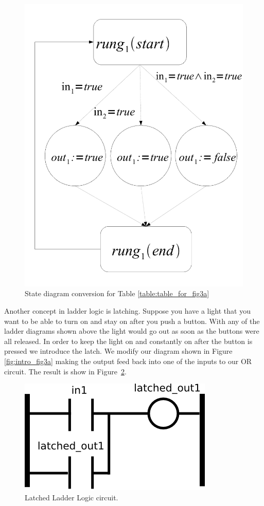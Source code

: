 \begin{figure}[h]
    \centering
    \includegraphics[width=\imgmedsmall]{./images/intro_or_graph_3a.pdf} %
    \caption{State diagram conversion for Table \ref{table:table_for_fig3a}}
    \label{fig:intro_or_graph_3a}
\end{figure}

Another concept in ladder logic is latching. Suppose you have a light that you want to be able to turn on and stay on after you push a button. With any of the ladder diagrams shown above the light would go out as soon as the buttons were all released. In order to keep the light on and constantly on after the button is pressed we introduce the latch. We modify our diagram shown in Figure \ref{fig:intro_fig3a} making the output feed back into one of the inputs to our OR circuit. The result is show in Figure~\ref{fig:intro_fig_latched}.

\begin{figure}[h]
    \centering
    \includegraphics[width=\imgsmall]{./images/intro_fig_latched.png} 
    \caption{Latched Ladder Logic circuit.}
    \label{fig:intro_fig_latched}
\end{figure}

